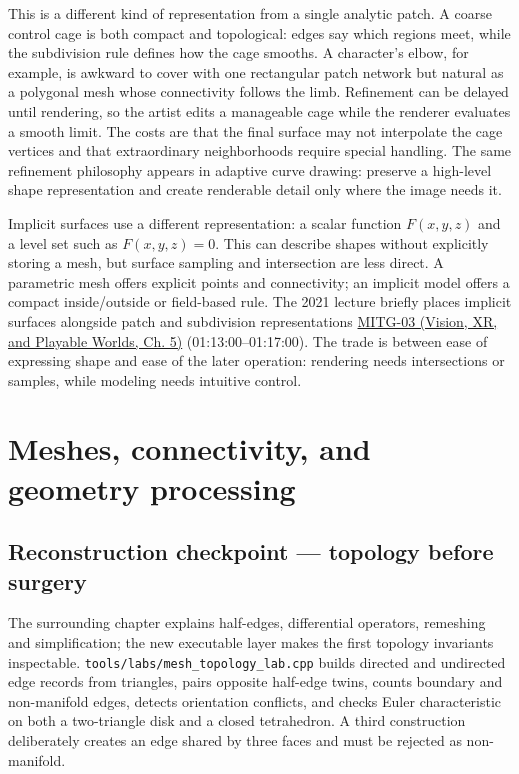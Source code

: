 This is a different kind of representation from a single analytic patch. A coarse control cage is both compact and topological: edges say which regions meet, while the subdivision rule defines how the cage smooths. A character's elbow, for example, is awkward to cover with one rectangular patch network but natural as a polygonal mesh whose connectivity follows the limb. Refinement can be delayed until rendering, so the artist edits a manageable cage while the renderer evaluates a smooth limit. The costs are that the final surface may not interpolate the cage vertices and that extraordinary neighborhoods require special handling. The same refinement philosophy appears in adaptive curve drawing: preserve a high-level shape representation and create renderable detail only where the image needs it.

Implicit surfaces use a different representation: a scalar function \(F(x,y,z)\) and a level set such as \(F(x,y,z)=0\). This can describe shapes without explicitly storing a mesh, but surface sampling and intersection are less direct. A parametric mesh offers explicit points and connectivity; an implicit model offers a compact inside/outside or field-based rule. The 2021 lecture briefly places implicit surfaces alongside patch and subdivision representations \href{../07-Vision-XR-and-Playable-Worlds/main.pdf\#nameddest=04-visual-computing-ii-ch036-mitg-03---curves-and-surfaces}{MITG-03 (Vision, XR, and Playable Worlds, Ch. 5)} (01:13:00--01:17:00). The trade is between ease of expressing shape and ease of the later operation: rendering needs intersections or samples, while modeling needs intuitive control.

\section{Meshes, connectivity, and geometry processing}\label{03-visual-computing-i-ch002-meshes-connectivity-and-geometry-processing}

\subsection{Reconstruction checkpoint --- topology before surgery}\label{03-visual-computing-i-ch002-reconstruction-checkpoint-topology-before-surgery}

The surrounding chapter explains half-edges, differential operators, remeshing and simplification; the new executable layer makes the first topology invariants inspectable. \texttt{tools/labs/mesh\_topology\_lab.cpp} builds directed and undirected edge records from triangles, pairs opposite half-edge twins, counts boundary and non-manifold edges, detects orientation conflicts, and checks Euler characteristic on both a two-triangle disk and a closed tetrahedron. A third construction deliberately creates an edge shared by three faces and must be rejected as non-manifold.

